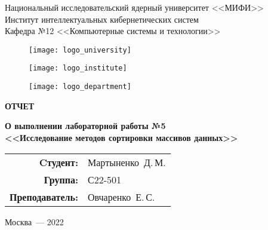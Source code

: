 \begin{titlepage}
  \begin{center}
    \begin{large}
      Национальный исследовательский ядерный университет <<МИФИ>> \\
      \vspace{0.25cm}
      Институт интеллектуальных кибернетических систем \\
      \vspace{0.25cm}
      Кафедра №12 <<Компьютерные системы и технологии>>
    \end{large}

    \vspace*{1cm}

    \begin{figure}[H]
      \centering
      \begin{minipage}[c]{0.3\textwidth}
        \texttt{[image: logo\_university]}
      \end{minipage}
      \hfill
      \begin{minipage}[c]{0.3\textwidth}
        \texttt{[image: logo\_institute]}
      \end{minipage}
      \hfill
      \begin{minipage}[c]{0.3\textwidth}
        \texttt{[image: logo\_department]}
      \end{minipage}
    \end{figure}

    \vspace{4cm}

    \begin{huge}
      \textbf{ОТЧЕТ}
    \end{huge}

    \begin{large}
      \textbf{О выполнении лабораторной работы №5 \\
        <<Исследование методов сортировки массивов данных>>}
    \end{large}
    
    \vfill
    
    \begin{flushright}
      \begin{tabular}{ r l }
        \textbf{Cтудент:} & Мартыненко~Д.\,М. \\ 
        \textbf{Группа:} & С22-501 \\  
        \textbf{Преподаватель:} & Овчаренко~Е.\,С. \\
      \end{tabular}
    \end{flushright}
            
    Москва~--- 2022
  \end{center}
\end{titlepage}
